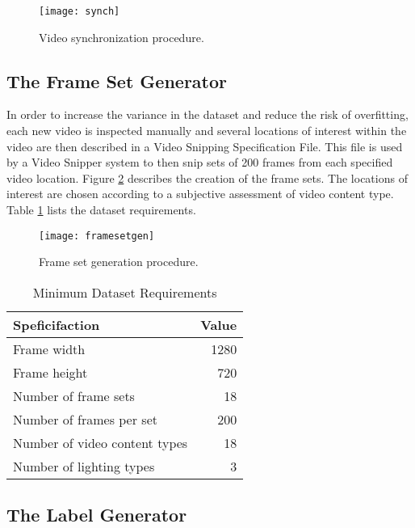 \begin{figure} [!h]
  \centering
  
  \texttt{[image: synch]}
  
  \caption{Video synchronization procedure.}
  \label{fig:synch}

\end{figure}

\subsection{The Frame Set Generator}
\label{sec:sol_framesetgen}

In order to increase the variance in the dataset and reduce the risk of overfitting, each new video is inspected manually and several locations of interest within the video are then described in a Video Snipping Specification File. This file is used by a Video Snipper system to then snip sets of 200 frames from each specified video location. Figure \ref{fig:framesetgen} describes the creation of the frame sets. The locations of interest are chosen according to a subjective assessment of video content type. Table \ref{tab:dataset-req} lists the dataset requirements.

\begin{figure} [!h]
  \centering
  
  \texttt{[image: framesetgen]}
  
  \caption{Frame set generation procedure.}
  \label{fig:framesetgen}

\end{figure}

\begin{table}[htbp]
  \caption{Minimum Dataset Requirements}
  \label{tab:dataset-req}
  \centering
  \begin{tabular}{lr}
    \hline
    \textbf{Speficifaction} & \textbf{Value} \\
    \hline
    Frame width & 1280 \\
    Frame height & 720 \\
    Number of frame sets & 18 \\
    Number of frames per set & 200 \\    
    Number of video content types & 18 \\
    Number of lighting types & 3 \\
    \hline
  \end{tabular}
\end{table}

\subsection{The Label Generator}
\label{sec:sol_labeler}

